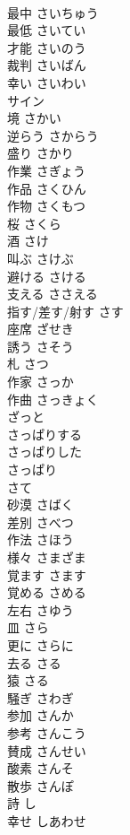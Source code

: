 \documentclass[8pt]{extreport}
\begin{document}
\begin{CJK}{UTF8}{min}
\\	最中	さいちゅう	
\\	最低	さいてい	
\\	才能	さいのう	
\\	裁判	さいばん	
\\	幸い	さいわい	
\\	サイン		
\\	境	さかい	
\\	逆らう	さからう	
\\	盛り	さかり	
\\	作業	さぎょう	
\\	作品	さくひん	
\\	作物	さくもつ	
\\	桜	さくら	
\\	酒	さけ	
\\	叫ぶ	さけぶ	
\\	避ける	さける	
\\	支える	ささえる	
\\	指す/差す/射す	さす	
\\	座席	ざせき	
\\	誘う	さそう	
\\	札	さつ	
\\	作家	さっか	
\\	作曲	さっきょく	
\\	ざっと		
\\	さっぱりする		
\\	さっぱりした		
\\	さっぱり		
\\	さて		
\\	砂漠	さばく	
\\	差別	さべつ	
\\	作法	さほう	
\\	様々	さまざま	
\\	覚ます	さます	
\\	覚める	さめる	
\\	左右	さゆう	
\\	皿	さら	
\\	更に	さらに	
\\	去る	さる	
\\	猿	さる	
\\	騒ぎ	さわぎ	
\\	参加	さんか	
\\	参考	さんこう	
\\	賛成	さんせい	
\\	酸素	さんそ	
\\	散歩	さんぽ	
\\	詩	し	
\\	幸せ	しあわせ	

\end{CJK}
\end{document}
